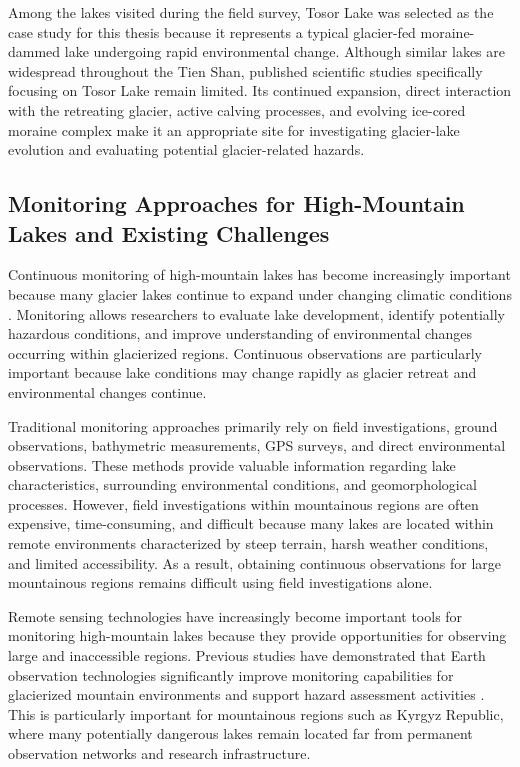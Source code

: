 \documentclass[12pt,a4paper]{report}
\begin{document}
Among the lakes visited during the field survey, Tosor Lake was selected as the case study for this thesis because it represents a typical glacier-fed moraine-dammed lake undergoing rapid environmental change. Although similar lakes are widespread throughout the Tien Shan, published scientific studies specifically focusing on Tosor Lake remain limited. Its continued expansion, direct interaction with the retreating glacier, active calving processes, and evolving ice-cored moraine complex make it an appropriate site for investigating glacier-lake evolution and evaluating potential glacier-related hazards.


\subsection{Monitoring Approaches for High-Mountain Lakes and Existing Challenges}

Continuous monitoring of high-mountain lakes has become increasingly important because many glacier lakes continue to expand under changing climatic conditions \cite{Carrivick2016, Harrison2018}. Monitoring allows researchers to evaluate lake development, identify potentially hazardous conditions, and improve understanding of environmental changes occurring within glacierized regions. Continuous observations are particularly important because lake conditions may change rapidly as glacier retreat and environmental changes continue. 

Traditional monitoring approaches primarily rely on field investigations, ground observations, bathymetric measurements, GPS surveys, and direct environmental observations. These methods provide valuable information regarding lake characteristics, surrounding environmental conditions, and geomorphological processes. However, field investigations within mountainous regions are often expensive, time-consuming, and difficult because many lakes are located within remote environments characterized by steep terrain, harsh weather conditions, and limited accessibility. As a result, obtaining continuous observations for large mountainous regions remains difficult using field investigations alone. 

Remote sensing technologies have increasingly become important tools for monitoring high-mountain lakes because they provide opportunities for observing large and inaccessible regions. Previous studies have demonstrated that Earth observation technologies significantly improve monitoring capabilities for glacierized mountain environments and support hazard assessment activities \cite{Kaab2021}. This is particularly important for mountainous regions such as Kyrgyz Republic, where many potentially dangerous lakes remain located far from permanent observation networks and research infrastructure. 
\end{document}
